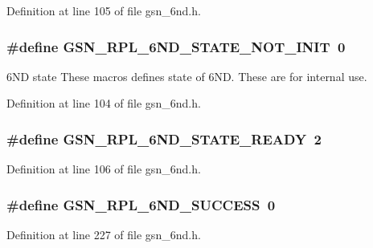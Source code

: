 Definition at line 105 of file gsn\_\-6nd.h.

\hypertarget{a00473_a6ebf22e3146df8d19f3a8021227b1ebe}{
\subsubsection[{GSN\_\-RPL\_\-6ND\_\-STATE\_\-NOT\_\-INIT}]{\setlength{\rightskip}{0pt plus 5cm}\#define GSN\_\-RPL\_\-6ND\_\-STATE\_\-NOT\_\-INIT~0}}
\label{a00473_a6ebf22e3146df8d19f3a8021227b1ebe}


6ND state These macros defines state of 6ND. These are for internal use. 



Definition at line 104 of file gsn\_\-6nd.h.

\hypertarget{a00473_a91a4d2770ff399e288fced8e9ef1091c}{
\subsubsection[{GSN\_\-RPL\_\-6ND\_\-STATE\_\-READY}]{\setlength{\rightskip}{0pt plus 5cm}\#define GSN\_\-RPL\_\-6ND\_\-STATE\_\-READY~2}}
\label{a00473_a91a4d2770ff399e288fced8e9ef1091c}


Definition at line 106 of file gsn\_\-6nd.h.

\hypertarget{a00473_a8723f37bf7d4719c669b5cdd2d68f748}{
\subsubsection[{GSN\_\-RPL\_\-6ND\_\-SUCCESS}]{\setlength{\rightskip}{0pt plus 5cm}\#define GSN\_\-RPL\_\-6ND\_\-SUCCESS~0}}
\label{a00473_a8723f37bf7d4719c669b5cdd2d68f748}


Definition at line 227 of file gsn\_\-6nd.h.

